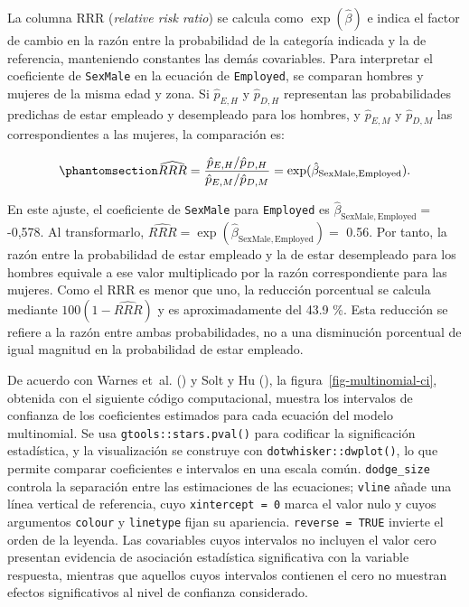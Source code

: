 \documentclass[
  spanish,
  11pt,
  letterpaper,
  oneside,
  open=any]{scrbook}
\begin{document}
{\begin{longtable}[]
\end{longtable}

}

La columna RRR (\emph{relative risk ratio}) se calcula como
\(\exp(\hat\beta)\) e indica el factor de cambio en la razón entre la
probabilidad de la categoría indicada y la de referencia, manteniendo
constantes las demás covariables. Para interpretar el coeficiente de
\texttt{SexMale} en la ecuación de \texttt{Employed}, se comparan
hombres y mujeres de la misma edad y zona. Si \(\hat p_{E,H}\) y
\(\hat p_{D,H}\) representan las probabilidades predichas de estar
empleado y desempleado para los hombres, y \(\hat p_{E,M}\) y
\(\hat p_{D,M}\) las correspondientes a las mujeres, la comparación es:

\begin{equation}\protect\phantomsection\label{eq-rrr}{
\widehat{RRR}
=\frac{\hat p_{E,H}/\hat p_{D,H}}{\hat p_{E,M}/\hat p_{D,M}}
=\exp(\hat\beta_{\mathrm{SexMale,Employed}}).
}\end{equation}

En este ajuste, el coeficiente de \texttt{SexMale} para
\texttt{Employed} es \(\hat\beta_{\mathrm{SexMale,Employed}}=\) -0,578.
Al transformarlo,
\(\widehat{RRR}=\exp(\hat\beta_{\mathrm{SexMale,Employed}})=\) 0.56. Por
tanto, la razón entre la probabilidad de estar empleado y la de estar
desempleado para los hombres equivale a ese valor multiplicado por la
razón correspondiente para las mujeres. Como el RRR es menor que uno, la
reducción porcentual se calcula mediante \(100(1-\widehat{RRR})\) y es
aproximadamente del 43.9 \%. Esta reducción se refiere a la razón entre
ambas probabilidades, no a una disminución porcentual de igual magnitud
en la probabilidad de estar empleado.

De acuerdo con Warnes et~al. () y Solt y
Hu (), la
figura~\ref{fig-multinomial-ci}, obtenida con el siguiente código
computacional, muestra los intervalos de confianza de los coeficientes
estimados para cada ecuación del modelo multinomial. Se usa
\texttt{gtools::stars.pval()} para codificar la significación
estadística, y la visualización se construye con
\texttt{dotwhisker::dwplot()}, lo que permite comparar coeficientes e
intervalos en una escala común. \texttt{dodge\_size} controla la
separación entre las estimaciones de las ecuaciones; \texttt{vline}
añade una línea vertical de referencia, cuyo \texttt{xintercept\ =\ 0}
marca el valor nulo y cuyos argumentos \texttt{colour} y
\texttt{linetype} fijan su apariencia. \texttt{reverse\ =\ TRUE}
invierte el orden de la leyenda. Las covariables cuyos intervalos no
incluyen el valor cero presentan evidencia de asociación estadística
significativa con la variable respuesta, mientras que aquellos cuyos
intervalos contienen el cero no muestran efectos significativos al nivel
de confianza considerado.
\end{document}

